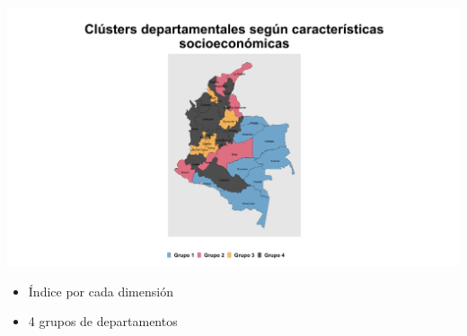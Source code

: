 \documentclass[aspectratio=169]{beamer}
\begin{document}
    \begin{slide}{18} 
            \begin{imagecolumn}
                \includegraphics[width=\columnwidth]{img/cluster_main.png}
            \end{imagecolumn}
            \begin{textcolumn}
                \begin{itemize}
                    \item Índice por cada dimensión
                    \item 4 grupos de departamentos
                \end{itemize}
            \end{textcolumn}
    \printcolumns
    \end{slide}
    
    
    
   
\end{document}
